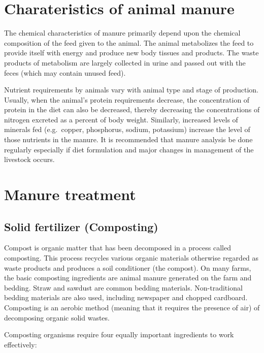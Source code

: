 \documentclass[]{book}
\begin{document}
\hypertarget{charateristics-of-animal-manure}{%
\section{Charateristics of animal manure}\label{charateristics-of-animal-manure}}

The chemical characteristics of manure primarily depend upon the chemical composition of the feed given to the animal. The animal metabolizes the feed to provide itself with energy and produce new body tissues and products. The waste products of metabolism are largely collected in urine and passed out with the feces (which may contain unused feed).

Nutrient requirements by animals vary with animal type and stage of production. Usually, when the animal's protein requirements decrease, the concentration of protein in the diet can also be decreased, thereby decreasing the concentrations of nitrogen excreted as a percent of body weight. Similarly, increased levels of minerals fed (e.g.~copper, phosphorus, sodium, potassium) increase the level of those nutrients in the manure. It is recommended that manure analysis be done regularly especially if diet formulation and major changes in management of the livestock occurs.

\hypertarget{manure-treatment}{%
\section{Manure treatment}\label{manure-treatment}}

\hypertarget{solid-fertilizer-composting}{%
\subsection{Solid fertilizer (Composting)}\label{solid-fertilizer-composting}}

Compost is organic matter that has been decomposed in a process called composting. This process recycles various organic materials otherwise regarded as waste products and produces a soil conditioner (the compost). On many farms, the basic composting ingredients are animal manure generated on the farm and bedding. Straw and sawdust are common bedding materials. Non-traditional bedding materials are also used, including newspaper and chopped cardboard. Composting is an aerobic method (meaning that it requires the presence of air) of decomposing organic solid wastes.

Composting organisms require four equally important ingredients to work effectively:
\end{document}
